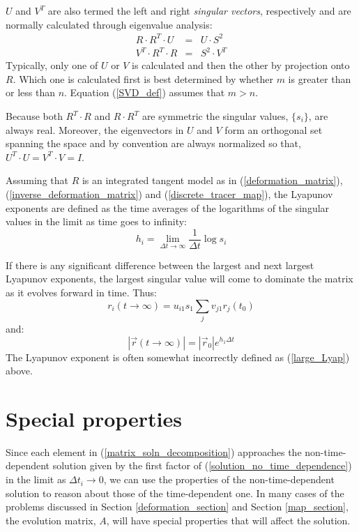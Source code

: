 \documentclass[11pt]{article}
\begin{document}
$U$ and $V^T$ are also termed the left and right {\it singular vectors}, 
respectively and are normally calculated through eigenvalue analysis:
\begin{eqnarray}
R\cdot R^T \cdot U & = & U\cdot S^2 \\
V^T \cdot R^T \cdot R & = & S^2 \cdot V^T
\end{eqnarray}
Typically, only one of $U$ or $V$ is calculated and then the other by projection
onto $R$.  Which one is calculated first is best determined by whether $m$
is greater than or less than $n$.  Equation (\ref{SVD_def}) assumes that 
$m>n$.

Because both $R^T \cdot R$ and $R \cdot R^T$ are symmetric
the singular values,
$\lbrace s_i \rbrace$, are always real.
Moreover, the eigenvectors in $U$ and $V$ form an orthogonal set spanning the
space and by convention are always normalized so that,
$U^T \cdot U = V^T \cdot V = I$.

Assuming that $R$ is an integrated tangent model as in 
(\ref{deformation_matrix}), (\ref{inverse_deformation_matrix})
and (\ref{discrete_tracer_map}), 
the Lyapunov exponents are defined as the time averages of the logarithms
of the singular values in the limit as time goes to infinity:
\begin{equation}
h_i=\lim_{\Delta t \rightarrow \infty} \frac{1}{\Delta t} \log s_i
\end{equation}

If there is any significant difference between the largest and next largest
Lyapunov exponents, the largest singular value will come to dominate the matrix
as it evolves forward in time.  Thus:
\begin{equation}
r_i(t \rightarrow \infty) = u_{i1} s_1 \sum_j v_{j1} r_j(t_0)
\end{equation}
and:
\begin{equation}
|\vec r(t \rightarrow \infty)| = |\vec r_0| e^{h_1 \Delta t}
\label{large_Lyap}
\end{equation}
The Lyapunov exponent is often somewhat incorrectly defined as
(\ref{large_Lyap}) above.

\section{Special properties}

Since each element in (\ref{matrix_soln_decomposition}) approaches the
non-time-dependent solution given by the first factor of 
(\ref{solution_no_time_dependence}) in the limit as $\Delta t_i\rightarrow 0$, 
we can use the properties of the non-time-dependent solution to
reason about those of the time-dependent one.
In many cases of the problems discussed in Section \ref{deformation_section}
and Section \ref{map_section}, the evolution matrix, $A$, will have
special properties that will affect the solution.
\end{document}
